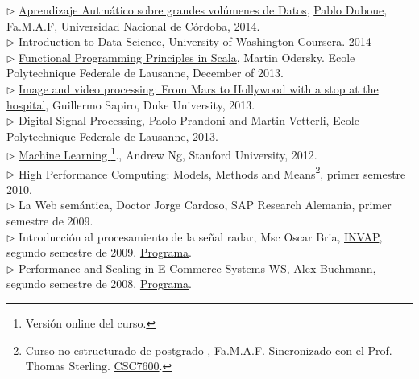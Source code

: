 \documentclass[a4paper,11pt,english]{article}
\begin{document}
$\triangleright$ \href{http://aprendizajengrande.net/}{Aprendizaje Autm\'atico sobre grandes vol\'umenes de Datos},  \href{http://duboue.net/}{Pablo Duboue}, Fa.M.A.F, Universidad Nacional de C\'ordoba,  2014.\\
$\triangleright$ Introduction to Data Science, University of Washington Coursera. 2014\\
$\triangleright$ \href{https://www.coursera.org/course/progfun}{Functional Programming Principles in Scala},  Martin Odersky. Ecole Polytechnique Federale de Lausanne, December of 2013.  \\
$\triangleright$ \href{https://www.coursera.org/course/images}{Image and video processing: From Mars to Hollywood with a stop at the hospital}, Guillermo Sapiro, Duke University, 2013. \\
$\triangleright$ \href{https://www.coursera.org/course/dsp}{Digital Signal Processing}, Paolo Prandoni and Martin Vetterli, Ecole Polytechnique Federale de Lausanne, 2013.\\
$\triangleright$ \href{http://www.ml-class.org}{Machine Learning \footnote{Versi\'on online del curso.}}., Andrew Ng, Stanford University, 2012. \\
$\triangleright$ High Performance Computing: Models, Methods and Means\footnote{Curso no estructurado de postgrado
, Fa.M.A.F. Sincronizado con el Prof. Thomas Sterling.
\href{http://www.cct.lsu.edu/csc7600/Home.html}{CSC7600}.}, primer semestre 2010.\\
$\triangleright$ La Web sem\'antica, Doctor Jorge Cardoso, SAP Research Alemania, primer semestre de 2009.\\
$\triangleright$ Introducci\'on al procesamiento de la señal radar, Msc Oscar Bria, 
\href{http://www.invap.net/index-e.php}{INVAP}, segundo semestre de 2009. \href{http://postgrado.info.unlp.edu.ar/Carrera/Programas/Contenidos_IPSR.pdf}{Programa}.\\
$\triangleright$ Performance and Scaling in E-Commerce Systems WS, Alex Buchmann, segundo semestre de 2008. 
\href{http://www.dvs.tu-darmstadt.de/teaching/perf/2008/}{Programa}.\\
\end{document}
